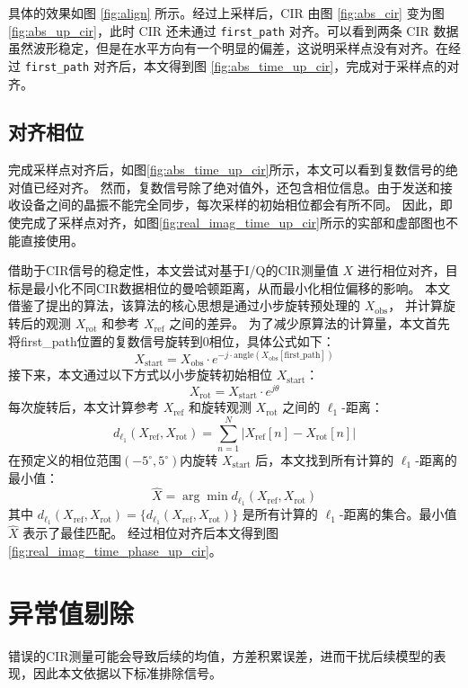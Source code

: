 具体的效果如图 \ref{fig:align} 所示。经过上采样后，CIR 由图 \ref{fig:abs_cir} 变为图 \ref{fig:abs_up_cir}，此时 CIR 还未通过 \texttt{first\_path} 对齐。可以看到两条 CIR 数据虽然波形稳定，但是在水平方向有一个明显的偏差，这说明采样点没有对齐。在经过 \texttt{first\_path} 对齐后，本文得到图 \ref{fig:abs_time_up_cir}，完成对于采样点的对齐。

\subsection{对齐相位}
完成采样点对齐后，如图\ref{fig:abs_time_up_cir}所示，本文可以看到复数信号的绝对值已经对齐。
然而，复数信号除了绝对值外，还包含相位信息。由于发送和接收设备之间的晶振不能完全同步，每次采样的初始相位都会有所不同。
因此，即使完成了采样点对齐，如图\ref{fig:real_imag_time_up_cir}所示的实部和虚部图也不能直接使用。

借助于CIR信号的稳定性，本文尝试对基于I/Q的CIR测量值 \( X \) 进行相位对齐，目标是最小化不同CIR数据相位的曼哈顿距离，从而最小化相位偏移的影响。
本文借鉴了\cite{IQ9452299}提出的算法，该算法的核心思想是通过小步旋转预处理的 \( X_{\text{obs}} \)，
并计算旋转后的观测 \( X_{\text{rot}} \) 和参考 \( X_{\text{ref}} \) 之间的差异。
为了减少原算法的计算量，本文首先将first\_path位置的复数信号旋转到0相位，具体公式如下：
\[
X_{\text{start}} = X_{\text{obs}} \cdot e^{-j \cdot \text{angle}(X_{\text{obs}}[\text{first\_path}])}
\]
接下来，本文通过以下方式以小步旋转初始相位 \( X_{\text{start}} \)：
\[
X_{\text{rot}} = X_{\text{start}} \cdot e^{j\theta}
\]
每次旋转后，本文计算参考 \( X_{\text{ref}} \) 和旋转观测 \( X_{\text{rot}} \) 之间的 \( \ell_1 \)-距离：
\[
d_{\ell_1}(X_{\text{ref}}, X_{\text{rot}}) = \sum_{n=1}^N |X_{\text{ref}}[n] - X_{\text{rot}}[n]|
\]
在预定义的相位范围\((-5^\circ,5^\circ)\)内旋转 \( X_{\text{start}} \) 后，本文找到所有计算的 \( \ell_1 \)-距离的最小值：
\[
\hat{X} = \arg\min d_{\ell_1}(X_{\text{ref}}, X_{\text{rot}})
\]
其中 \( d_{\ell_1}(X_{\text{ref}}, X_{\text{rot}}) = \{d_{\ell_1}(X_{\text{ref}}, X_{\text{rot}})\} \) 是所有计算的 \( \ell_1 \)-距离的集合。最小值 \( \hat{X} \) 表示了最佳匹配。
经过相位对齐后本文得到图\ref{fig:real_imag_time_phase_up_cir}。

\section{异常值剔除}

错误的CIR测量可能会导致后续的均值，方差积累误差，进而干扰后续模型的表现，因此本文依据以下标准排除信号。

